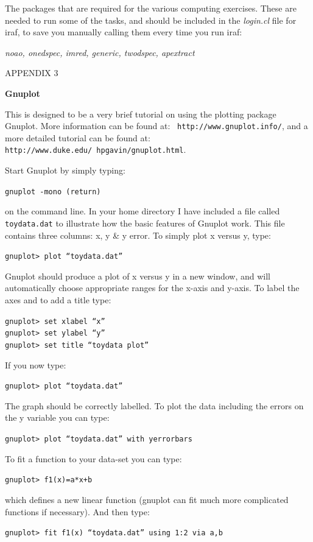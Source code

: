 \documentclass[12pt]{article}
\begin{document}
The packages that are required for the various computing exercises.  These are needed to run some of the tasks, and should be included in the {\it login.cl} file for {\sc iraf}, to save you manually calling them every time you run {\sc iraf}:

{\it noao, onedspec, imred, generic, twodspec, apextract} \\

\newpage
\centerline{\Huge APPENDIX 3}

\begin{center}
{\large{\bf Gnuplot}}
\end{center}
This is designed to be a very brief tutorial on using the plotting
package Gnuplot. More information can be found at: {\tt
http://www.gnuplot.info/}, and a more detailed tutorial can be found
at: {\tt http://www.duke.edu/~hpgavin/gnuplot.html}.

Start Gnuplot by simply typing:

{\tt gnuplot -mono (return)}

on the command line. In your home directory I have included a file
called {\tt toydata.dat} to illustrate how the basic features of
Gnuplot work. This file contains three columns: x, y \& y error. 
To simply plot x versus y, type:

{\tt gnuplot> plot ``toydata.dat''}

Gnuplot should produce a plot of x versus y in a new window, and will
automatically choose appropriate ranges for the x-axis and y-axis. To
label the axes and to add a title type:

{\tt gnuplot> set xlabel ``x''}\\
{\tt gnuplot> set ylabel ``y''}\\
{\tt gnuplot> set title ``toydata plot''}

If you now type:

{\tt gnuplot> plot ``toydata.dat''}

The graph should be correctly labelled. To plot the data including the
errors on the y variable you can type:

{\tt gnuplot> plot ``toydata.dat'' with yerrorbars}

To fit a function to your data-set you can type:

{\tt gnuplot> f1(x)=a*x+b}

which defines a new linear function (gnuplot can fit much more
complicated functions if necessary). And then type:

{\tt gnuplot> fit f1(x) ``toydata.dat'' using 1:2 via a,b}
\end{document}
